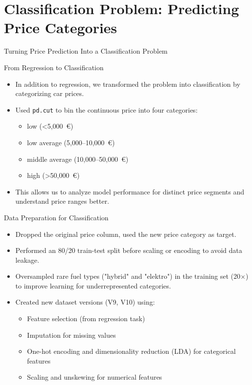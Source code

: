\documentclass{beamer}
\begin{document}
\section{Classification Problem: Predicting Price Categories}
\begin{frame}
    \centering
    \Huge
    Turning Price Prediction Into a Classification Problem
\end{frame}


\begin{frame}{From Regression to Classification}
    \begin{itemize}
        \item In addition to regression, we transformed the problem into classification by categorizing car prices.
        \item Used \texttt{pd.cut} to bin the continuous price into four categories:
        \begin{itemize}
            \item low (\textless 5,000~€)
            \item low average (5,000–10,000~€)
            \item middle average (10,000–50,000~€)
            \item high (\textgreater 50,000~€)
        \end{itemize}
        \item This allows us to analyze model performance for distinct price segments and understand price ranges better.
    \end{itemize}
\end{frame}


\begin{frame}{Data Preparation for Classification}
    \begin{itemize}
        \item Dropped the original price column, used the new price category as target.
        \item Performed an 80/20 train-test split before scaling or encoding to avoid data leakage.
        \item Oversampled rare fuel types ("hybrid" and "elektro") in the training set (20$\times$) to improve learning for underrepresented categories.
        \item Created new dataset versions (V9, V10) using:
        \begin{itemize}
            \item Feature selection (from regression task)
            \item Imputation for missing values
            \item One-hot encoding and dimensionality reduction (LDA) for categorical features
            \item Scaling and unskewing for numerical features
        \end{itemize}
    \end{itemize}
\end{frame}
\end{document}
